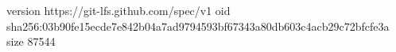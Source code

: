 version https://git-lfs.github.com/spec/v1
oid sha256:03b90fe15ecde7e842b04a7ad9794593bf67343a80db603c4acb29c72bfcfe3a
size 87544
